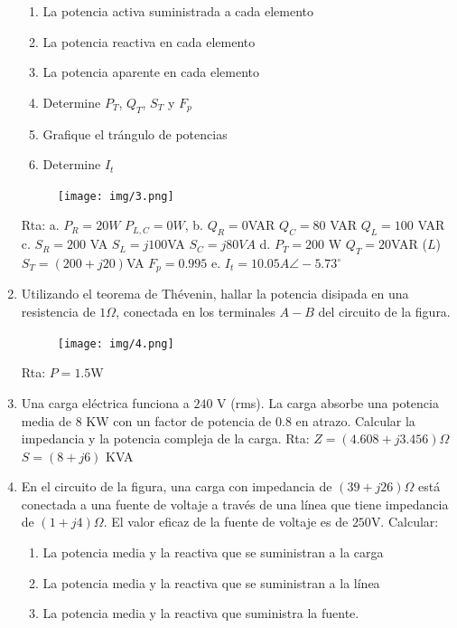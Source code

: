 \documentclass[10pt,a4paper]{article}
\begin{document}
\begin{enumerate}
\begin{enumerate}
	\item La potencia activa suministrada a cada elemento   
	\item La potencia reactiva en cada elemento
	\item La potencia aparente en cada elemento   
	\item Determine $P_T$, $Q_T$, $S_T$ y $F_p$   
	\item Grafique el trángulo de potencias  
	\item Determine $I_t$    
\end{enumerate}
\begin{figure}[H]
	\centering
	\texttt{[image: img/3.png]}
	\label{e3}
\end{figure}

Rta: a. $P_R=20W$ $P_{L,C}=0W$, b. $Q_R=0$VAR $Q_C=80$ VAR $ Q_L=100$ VAR c. $S_R=200$ VA $S_L=j100$VA $S_C=j80VA$ d. $P_T=200$ W  $Q_T=20$VAR ($L$) $S_T= (200+j20)$VA $F_p=0.995$ e. $I_t=10.05A \angle-5.73^\circ$


\item  Utilizando el teorema de Thévenin, hallar la potencia disipada en una resistencia de $1\Omega$, conectada en los terminales $A-B$ del circuito de la figura.
\begin{figure}[H]
	\centering
	\texttt{[image: img/4.png]}
	\label{e4}
\end{figure}

Rta: $P=1.5$W

\item Una carga eléctrica funciona a $240$ V (rms). La carga absorbe una potencia media de $8$ KW
con un factor de potencia de $0.8$ en atrazo. Calcular la impedancia y la potencia compleja de
la carga.  
Rta: $Z=(4.608+j3.456)\Omega$ $S=(8+j6)$ KVA

 \item En el circuito de la figura, una carga con impedancia de $(39 + j 26)\Omega$ está conectada a una fuente de voltaje a través de una línea que tiene impedancia de $(1 +j4)\Omega$. El valor eficaz de la fuente de voltaje es de $250$V. Calcular:   
 \begin{enumerate}
 	\item La potencia media y la reactiva que se suministran a la carga   
 	\item La potencia media y la reactiva que se suministran a la línea   
 	\item La potencia media y la reactiva que suministra la fuente. 	
 \end{enumerate}
	

\end{enumerate}
\end{document}
